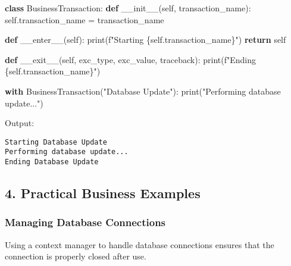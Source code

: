 \documentclass[
  letterpaper,
  DIV=11,
  numbers=noendperiod]{scrreprt}
\newenvironment{Shaded}{\begin{snugshade}}{\end{snugshade}}
\newcommand{\BuiltInTok}[1]{\textcolor[rgb]{0.00,0.23,0.31}{#1}}
\newcommand{\ControlFlowTok}[1]{\textcolor[rgb]{0.00,0.23,0.31}{\textbf{#1}}}
\newcommand{\FunctionTok}[1]{\textcolor[rgb]{0.28,0.35,0.67}{#1}}
\newcommand{\KeywordTok}[1]{\textcolor[rgb]{0.00,0.23,0.31}{\textbf{#1}}}
\newcommand{\NormalTok}[1]{\textcolor[rgb]{0.00,0.23,0.31}{#1}}
\newcommand{\OperatorTok}[1]{\textcolor[rgb]{0.37,0.37,0.37}{#1}}
\newcommand{\SpecialCharTok}[1]{\textcolor[rgb]{0.37,0.37,0.37}{#1}}
\newcommand{\SpecialStringTok}[1]{\textcolor[rgb]{0.13,0.47,0.30}{#1}}
\newcommand{\StringTok}[1]{\textcolor[rgb]{0.13,0.47,0.30}{#1}}
\newcommand{\VariableTok}[1]{\textcolor[rgb]{0.07,0.07,0.07}{#1}}
\begin{document}
\begin{Shaded}
\begin{Highlighting}[]
\KeywordTok{class}\NormalTok{ BusinessTransaction:}
    \KeywordTok{def} \FunctionTok{\_\_init\_\_}\NormalTok{(}\VariableTok{self}\NormalTok{, transaction\_name):}
        \VariableTok{self}\NormalTok{.transaction\_name }\OperatorTok{=}\NormalTok{ transaction\_name}

    \KeywordTok{def} \FunctionTok{\_\_enter\_\_}\NormalTok{(}\VariableTok{self}\NormalTok{):}
        \BuiltInTok{print}\NormalTok{(}\SpecialStringTok{f"Starting }\SpecialCharTok{\{}\VariableTok{self}\SpecialCharTok{.}\NormalTok{transaction\_name}\SpecialCharTok{\}}\SpecialStringTok{"}\NormalTok{)}
        \ControlFlowTok{return} \VariableTok{self}

    \KeywordTok{def} \FunctionTok{\_\_exit\_\_}\NormalTok{(}\VariableTok{self}\NormalTok{, exc\_type, exc\_value, traceback):}
        \BuiltInTok{print}\NormalTok{(}\SpecialStringTok{f"Ending }\SpecialCharTok{\{}\VariableTok{self}\SpecialCharTok{.}\NormalTok{transaction\_name}\SpecialCharTok{\}}\SpecialStringTok{"}\NormalTok{)}

\ControlFlowTok{with}\NormalTok{ BusinessTransaction(}\StringTok{"Database Update"}\NormalTok{):}
    \BuiltInTok{print}\NormalTok{(}\StringTok{"Performing database update..."}\NormalTok{)}
\end{Highlighting}
\end{Shaded}

Output:

\begin{verbatim}
Starting Database Update
Performing database update...
Ending Database Update
\end{verbatim}

\subsection{4. Practical Business
Examples}\label{practical-business-examples-1}

\subsubsection{Managing Database
Connections}\label{managing-database-connections}

Using a context manager to handle database connections ensures that the
connection is properly closed after use.
\end{document}
